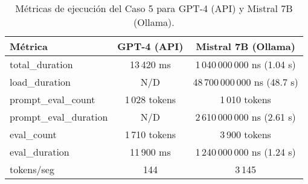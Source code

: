 
\begin{table}[h!]
\centering
\begin{tabular}{|l|c|c|}
\hline
\textbf{Métrica} & \textbf{GPT-4 (API)} & \textbf{Mistral 7B (Ollama)} \\
\hline
total\_duration & 13\,420 ms & 1\,040\,000\,000 ns (1.04 s) \\
load\_duration & N/D & 48\,700\,000\,000 ns (48.7 s) \\
prompt\_eval\_count & 1\,028 tokens & 1\,010 tokens \\
prompt\_eval\_duration & N/D & 2\,610\,000\,000 ns (2.61 s) \\
eval\_count & 1\,710 tokens & 3\,900 tokens \\
eval\_duration & 11\,900 ms & 1\,240\,000\,000 ns (1.24 s) \\
tokens/seg & 144 & 3\,145 \\
\hline
\end{tabular}
\caption{Métricas de ejecución del Caso 5 para GPT-4 (API) y Mistral 7B (Ollama).}
\end{table}
